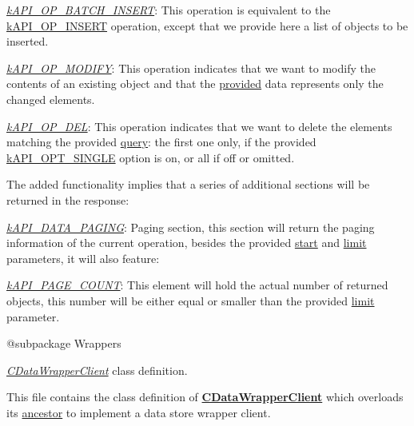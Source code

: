 \begin{DoxyItemize}
\item {\itshape \hyperlink{}{k\-A\-P\-I\-\_\-\-O\-P\-\_\-\-B\-A\-T\-C\-H\-\_\-\-I\-N\-S\-E\-R\-T}}\-: This operation is equivalent to the \hyperlink{}{k\-A\-P\-I\-\_\-\-O\-P\-\_\-\-I\-N\-S\-E\-R\-T} operation, except that we provide here a list of objects to be inserted. 
\item {\itshape \hyperlink{}{k\-A\-P\-I\-\_\-\-O\-P\-\_\-\-M\-O\-D\-I\-F\-Y}}\-: This operation indicates that we want to modify the contents of an existing object and that the \hyperlink{}{provided} data represents only the changed elements. 
\item {\itshape \hyperlink{}{k\-A\-P\-I\-\_\-\-O\-P\-\_\-\-D\-E\-L}}\-: This operation indicates that we want to delete the elements matching the provided \hyperlink{}{query}\-: the first one only, if the provided \hyperlink{}{k\-A\-P\-I\-\_\-\-O\-P\-T\-\_\-\-S\-I\-N\-G\-L\-E} option is on, or all if off or omitted. 
\end{DoxyItemize}

The added functionality implies that a series of additional sections will be returned in the response\-:


\begin{DoxyItemize}
\item {\itshape \hyperlink{}{k\-A\-P\-I\-\_\-\-D\-A\-T\-A\-\_\-\-P\-A\-G\-I\-N\-G}}\-: Paging section, this section will return the paging information of the current operation, besides the provided \hyperlink{}{start} and \hyperlink{}{limit} parameters, it will also feature\-: 
\begin{DoxyItemize}
\item {\itshape \hyperlink{}{k\-A\-P\-I\-\_\-\-P\-A\-G\-E\-\_\-\-C\-O\-U\-N\-T}}\-: This element will hold the actual number of returned objects, this number will be either equal or smaller than the provided \hyperlink{}{limit} parameter. 
\end{DoxyItemize}
\end{DoxyItemize}

\begin{DoxyVerb}    @subpackage     Wrappers\end{DoxyVerb}


{\itshape \hyperlink{class_c_data_wrapper_client}{C\-Data\-Wrapper\-Client}} class definition.

This file contains the class definition of {\bfseries \hyperlink{class_c_data_wrapper_client}{C\-Data\-Wrapper\-Client}} which overloads its \hyperlink{class_c_wrapper_client}{ancestor} to implement a data store wrapper client.

